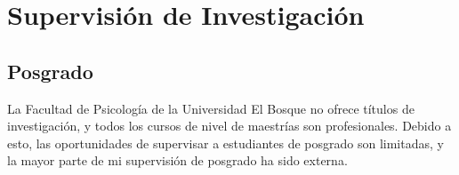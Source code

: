 \documentclass[11pt,a4paper,]{awesome-cv}
\begin{document}
\endgroup

\hypertarget{supervisiuxf3n-de-investigaciuxf3n}{%
\section{Supervisión de
Investigación}\label{supervisiuxf3n-de-investigaciuxf3n}}

\hypertarget{section}{%
\subsection{\texorpdfstring{\textbf{Posgrado}}{}}\label{section}}

\begin{footnotesize}
La Facultad de Psicología de la Universidad El Bosque no ofrece títulos de investigación, y todos los cursos de nivel de maestrías son profesionales. Debido a esto, las oportunidades de supervisar a estudiantes de posgrado son limitadas, y la mayor parte de mi supervisión de posgrado ha sido externa.
\end{footnotesize}
\end{document}
